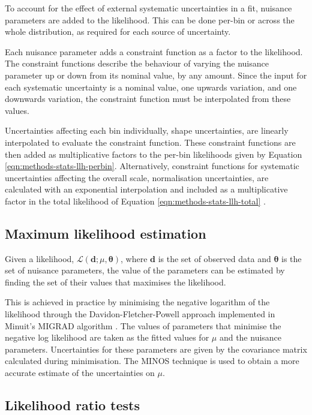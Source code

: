 To account for the effect of external systematic uncertainties in a fit,
nuisance parameters are added to the likelihood. This can be done per-bin or
across the whole distribution, as required for each source of uncertainty.

Each nuisance parameter adds a constraint function as a factor to the
likelihood. The constraint functions describe the behaviour of varying the
nuisance parameter up or down from its nominal value, by any amount. Since the
input for each systematic uncertainty is a nominal value, one upwards variation,
and one downwards variation, the constraint function must be interpolated from
these values.

Uncertainties affecting each bin individually, shape uncertainties, are linearly
interpolated to evaluate the constraint function. These constraint functions are
then added as multiplicative factors to the per-bin likelihoods given by
Equation \ref{eqn:methods-stats-llh-perbin}. Alternatively, constraint functions
for systematic uncertainties affecting the overall scale, normalisation
uncertainties, are calculated with an exponential interpolation and included as
a multiplicative factor in the total likelihood of Equation
\ref{eqn:methods-stats-llh-total} \cite{Cranmer2012}.

\subsection{Maximum likelihood estimation}

\newcommand\dvec{\ensuremath{\mathbf{d}}\xspace}
\newcommand\thetavec{\ensuremath{\boldsymbol{\theta}}\xspace}
Given a likelihood, $\mathcal{L}(\dvec;\mu,\thetavec)$, where \dvec is the set
of observed data and \thetavec is the set of nuisance parameters, the value of
the parameters can be estimated by finding the set of their values that
maximises the likelihood.

This is achieved in practice by minimising the negative logarithm of the
likelihood through the Davidon-Fletcher-Powell approach
\cite{Davidon1959,Fletcher1970,Powell1983} implemented in Minuit's MIGRAD
algorithm \cite{Minuit2}.  The values of parameters that minimise the negative
log likelihood are taken as the fitted values for $\mu$ and the nuisance
parameters. Uncertainties for these parameters are given by the covariance
matrix calculated during minimisation. The MINOS technique \cite{Minuit2} is
used to obtain a more accurate estimate of the uncertainties on $\mu$.

\subsection{Likelihood ratio tests}
\label{sec:methods-stats-llhr}

